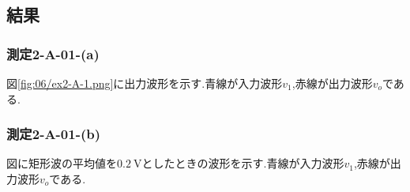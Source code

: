 \subsection{結果}
\subsubsection{測定2-A-01-(a)}
図\ref{fig:06/ex2-A-1.png}に出力波形を示す.青線が入力波形$v_1$,赤線が出力波形$v_o$である.
\clearpage
\subsubsection{測定2-A-01-(b)}
図に矩形波の平均値を$0.2\ \si{\volt}$としたときの波形を示す.青線が入力波形$v_1$,赤線が出力波形$v_o$である.
